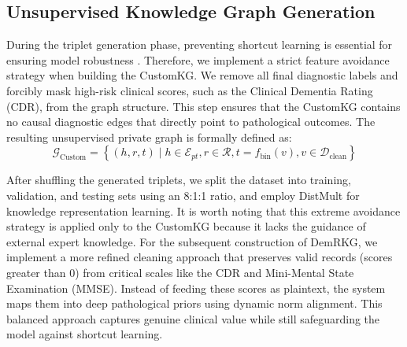 \documentclass[sn-mathphys-num]{sn-jnl}%
\theoremstyle{thmstyleone}%
\theoremstyle{thmstyletwo}%
\theoremstyle{thmstylethree}%
\begin{document}
\subsection{Unsupervised Knowledge Graph Generation}
During the triplet generation phase, preventing shortcut learning is essential for ensuring model robustness \cite{geirhos2020shortcut}. Therefore, we implement a strict feature avoidance strategy when building the CustomKG. We remove all final diagnostic labels and forcibly mask high-risk clinical scores, such as the Clinical Dementia Rating (CDR), from the graph structure. This step ensures that the CustomKG contains no causal diagnostic edges that directly point to pathological outcomes. The resulting unsupervised private graph is formally defined as:
\begin{equation}
\mathcal{G}_{\mathrm{Custom}} = \left\{ (h, r, t) \mid h \in \mathcal{E}_{pt}, r \in \mathcal{R}, t = f_{\mathrm{bin}}(v), v \in \mathcal{D}_{\mathrm{clean}} \right\}
\label{eq:custom_kg}
\end{equation}

After shuffling the generated triplets, we split the dataset into training, validation, and testing sets using an 8:1:1 ratio, and employ DistMult for knowledge representation learning. It is worth noting that this extreme avoidance strategy is applied only to the CustomKG because it lacks the guidance of external expert knowledge. For the subsequent construction of DemRKG, we implement a more refined cleaning approach that preserves valid records (scores greater than 0) from critical scales like the CDR and Mini-Mental State Examination (MMSE). Instead of feeding these scores as plaintext, the system maps them into deep pathological priors using dynamic norm alignment. This balanced approach captures genuine clinical value while still safeguarding the model against shortcut learning.
\end{document}
